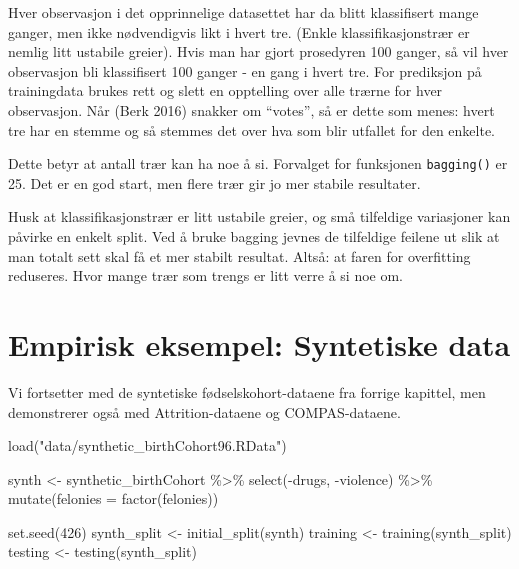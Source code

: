 \documentclass[
  letterpaper,
  DIV=11,
  numbers=noendperiod]{scrreprt}
\newenvironment{Shaded}{\begin{snugshade}}{\end{snugshade}}
\newcommand{\AttributeTok}[1]{\textcolor[rgb]{0.40,0.45,0.13}{#1}}
\newcommand{\DecValTok}[1]{\textcolor[rgb]{0.68,0.00,0.00}{#1}}
\newcommand{\FunctionTok}[1]{\textcolor[rgb]{0.28,0.35,0.67}{#1}}
\newcommand{\NormalTok}[1]{\textcolor[rgb]{0.00,0.23,0.31}{#1}}
\newcommand{\OtherTok}[1]{\textcolor[rgb]{0.00,0.23,0.31}{#1}}
\newcommand{\SpecialCharTok}[1]{\textcolor[rgb]{0.37,0.37,0.37}{#1}}
\newcommand{\StringTok}[1]{\textcolor[rgb]{0.13,0.47,0.30}{#1}}
\begin{document}
Hver observasjon i det opprinnelige datasettet har da blitt klassifisert
mange ganger, men ikke nødvendigvis likt i hvert tre. (Enkle
klassifikasjonstrær er nemlig litt ustabile greier). Hvis man har gjort
prosedyren 100 ganger, så vil hver observasjon bli klassifisert 100
ganger - en gang i hvert tre. For prediksjon på trainingdata brukes rett
og slett en opptelling over alle trærne for hver observasjon. Når (Berk
2016) snakker om ``votes'', så er dette som menes: hvert tre har en
stemme og så stemmes det over hva som blir utfallet for den enkelte.

Dette betyr at antall trær kan ha noe å si. Forvalget for funksjonen
\texttt{bagging()} er 25. Det er en god start, men flere trær gir jo mer
stabile resultater.

Husk at klassifikasjonstrær er litt ustabile greier, og små tilfeldige
variasjoner kan påvirke en enkelt split. Ved å bruke bagging jevnes de
tilfeldige feilene ut slik at man totalt sett skal få et mer stabilt
resultat. Altså: at faren for overfitting reduseres. Hvor mange trær som
trengs er litt verre å si noe om.

\section{Empirisk eksempel: Syntetiske
data}\label{empirisk-eksempel-syntetiske-data}

Vi fortsetter med de syntetiske fødselskohort-dataene fra forrige
kapittel, men demonstrerer også med Attrition-dataene og COMPAS-dataene.

\begin{Shaded}
\begin{Highlighting}[]
\FunctionTok{load}\NormalTok{(}\StringTok{"data/synthetic\_birthCohort96.RData"}\NormalTok{)}

\NormalTok{synth }\OtherTok{\textless{}{-}}\NormalTok{ synthetic\_birthCohort }\SpecialCharTok{\%\textgreater{}\%}
  \FunctionTok{select}\NormalTok{(}\SpecialCharTok{{-}}\NormalTok{drugs, }\SpecialCharTok{{-}}\NormalTok{violence) }\SpecialCharTok{\%\textgreater{}\%}
  \FunctionTok{mutate}\NormalTok{(}\AttributeTok{felonies =} \FunctionTok{factor}\NormalTok{(felonies))}

\FunctionTok{set.seed}\NormalTok{(}\DecValTok{426}\NormalTok{)}
\NormalTok{synth\_split }\OtherTok{\textless{}{-}} \FunctionTok{initial\_split}\NormalTok{(synth)}
\NormalTok{training }\OtherTok{\textless{}{-}} \FunctionTok{training}\NormalTok{(synth\_split)}
\NormalTok{testing  }\OtherTok{\textless{}{-}} \FunctionTok{testing}\NormalTok{(synth\_split)}
\end{Highlighting}
\end{Shaded}
\end{document}
